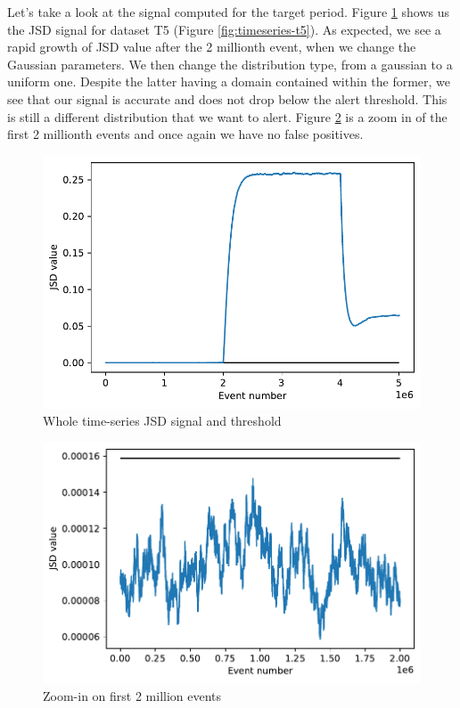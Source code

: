\documentclass[sigconf]{acmart}
\begin{document}
Let's take a look at the signal computed for the target period. Figure \ref{fig:JSD-signal-test05} shows us the JSD signal for dataset T5 (Figure \ref{fig:timeseries-t5}). As expected, we see a rapid growth of JSD value after the 2 millionth event, when we change the Gaussian parameters. We then change the distribution type, from a gaussian to a uniform one. Despite the latter having a domain contained within the former, we see that our signal is accurate and does not drop below the alert threshold. This is still a different distribution that we want to alert. Figure \ref{fig:JSD-signal-zoom-test05} is a zoom in of the first 2 millionth events and once again we have no false positives.
\begin{figure}[!htb]
    \begin{center}
      \includegraphics[scale=0.5]{figures/stream-analysis-viz-test05.pdf}
      \caption{Whole time-series JSD signal and threshold}
      \label{fig:JSD-signal-test05}
    \end{center}
\end{figure}
\begin{figure}[!htb]
    \begin{center}
      \includegraphics[scale=0.5]{figures/stream-analysis-viz-zoom-test05.pdf}
      \caption{Zoom-in on first 2 million events}
    \label{fig:JSD-signal-zoom-test05}
    \end{center}
\end{figure}
\end{document}
